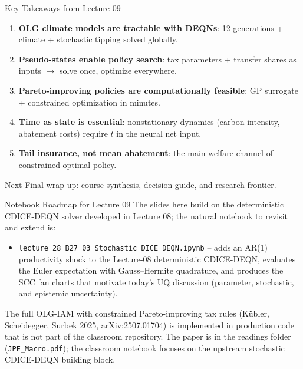 \documentclass[aspectratio=169,11pt]{beamer}
\begin{document}
\begin{frame}{Key Takeaways from Lecture 09}
\begin{enumerate}
    \item \textbf{OLG climate models are tractable with DEQNs}: 12 generations + climate + stochastic tipping solved globally.
    \item \textbf{Pseudo-states enable policy search}: tax parameters + transfer shares as inputs $\rightarrow$ solve once, optimize everywhere.
    \item \textbf{Pareto-improving policies are computationally feasible}: GP surrogate + constrained optimization in minutes.
    \item \textbf{Time as state is essential}: nonstationary dynamics (carbon intensity, abatement costs) require $t$ in the neural net input.
    \item \textbf{Tail insurance, not mean abatement}: the main welfare channel of constrained optimal policy.
\end{enumerate}

\vspace{0.2cm}
\begin{block}{Next}
Final wrap-up: course synthesis, decision guide, and research frontier.
\end{block}
\end{frame}

\begin{frame}{Notebook Roadmap for Lecture 09}
\small
The slides here build on the deterministic CDICE-DEQN solver developed in Lecture 08; the natural notebook to revisit and extend is:
\vspace{0.2cm}
\begin{itemize}
    \item \texttt{lecture\_28\_B27\_03\_Stochastic\_DICE\_DEQN.ipynb} -- adds an AR(1) productivity shock to the Lecture-08 deterministic CDICE-DEQN, evaluates the Euler expectation with Gauss--Hermite quadrature, and produces the SCC fan charts that motivate today's UQ discussion (parameter, stochastic, and epistemic uncertainty).
\end{itemize}
\vspace{0.2cm}
The full OLG-IAM with constrained Pareto-improving tax rules (K\"ubler, Scheidegger, Surbek 2025, arXiv:2507.01704) is implemented in production code that is not part of the classroom repository.  The paper is in the readings folder (\texttt{JPE\_Macro.pdf}); the classroom notebook focuses on the upstream stochastic CDICE-DEQN building block.
\end{frame}
\end{document}
